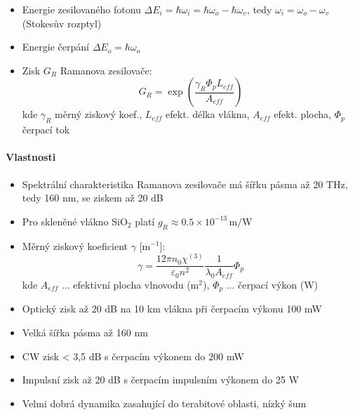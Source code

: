 \documentclass[a4paper, 12pt]{article}
\begin{document}
                \begin{itemize}
                    \item Energie zesilovaného fotonu $\Delta E_i = \hbar\omega_i = \hbar\omega_o - \hbar\omega_v$,
                    tedy $\omega_i = \omega_o - \omega_v$ (Stokesův rozptyl)
                    \item Energie čerpání $\Delta E_o = \hbar\omega_o$
                    \item Zisk $G_R$ Ramanova zesilovače:
                    \begin{equation}
                        G_R = \exp\!\left(\frac{\gamma_R\Phi_p L_{eff}}{A_{eff}}\right)
                    \end{equation}
                    kde $\gamma_R$ měrný ziskový koef., $L_{eff}$ efekt. délka vlákna, $A_{eff}$ efekt. plocha,
                    $\Phi_p$ čerpací tok
                \end{itemize}

                \paragraph{Vlastnosti}
                \begin{itemize}
                    \item Spektrální charakteristika Ramanova zesilovače má šířku pásma až 20 THz, tedy 160 nm,
                    se ziskem až 20 dB
                    \item Pro skleněné vlákno SiO$_2$ platí $g_R \approx 0.5 \times 10^{-13}\,\mathrm{m/W}$
                    \item Měrný ziskový koeficient $\gamma$ [m$^{-1}$]:
                    \begin{equation}
                        \gamma = \frac{12\pi n_0\chi^{(3)}}{\varepsilon_0 n^2}\frac{1}{\lambda_0 A_{eff}}\Phi_p
                    \end{equation}
                    kde $A_{eff}$ ... efektivní plocha vlnovodu (m$^2$), $\Phi_p$ ... čerpací výkon (W)
                    \item Optický zisk až 20 dB na 10 km vlákna při čerpacím výkonu 100 mW
                    \item Velká šířka pásma až 160 nm
                    \item CW zisk < 3,5 dB s čerpacím výkonem do 200 mW
                    \item Impulsní zisk až 20 dB s čerpacím impulsním výkonem do 25 W
                    \item Velmi dobrá dynamika zasahující do terabitové oblasti, nízký šum
                \end{itemize}
\end{document}
